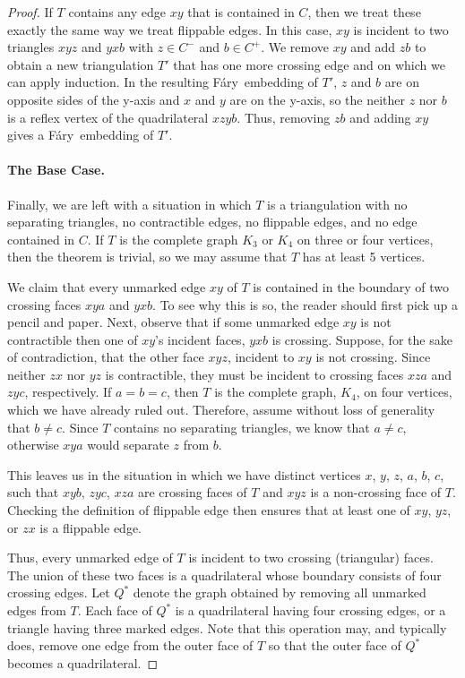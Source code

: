 \documentclass{patmorin}
\newcommand{\Fary}{Fáry}
\begin{document}
\begin{proof}
   If $T$ contains any edge $xy$ that is contained in $C$, then we
   treat these exactly the same way we treat flippable edges.  In this
   case, $xy$ is incident to two triangles $xyz$ and $yxb$ with $z\in
   C^-$ and $b\in C^+$. We remove $xy$ and add $zb$ to obtain a new
   triangulation $T'$ that has one more crossing edge and on which
   we can apply induction.  In the resulting \Fary\ embedding of $T'$,
   $z$ and $b$ are on opposite sides of the y-axis and $x$ and $y$
   are on the y-axis, so the neither $z$ nor $b$ is a reflex vertex of
   the quadrilateral $xzyb$.  Thus, removing $zb$ and adding $xy$ gives
   a \Fary\ embedding of $T'$.

   \paragraph{The Base Case.}

   Finally, we are left with a situation in which $T$ is a triangulation
   with no separating triangles, no contractible edges, no flippable
   edges, and no edge contained in $C$.  If $T$ is the complete graph
   $K_3$ or $K_4$ on three or four vertices, then the theorem is trivial,
   so we may assume that $T$ has at least 5 vertices.

   We claim that every unmarked edge $xy$ of $T$ is contained in the
   boundary of two crossing faces $xya$ and $yxb$.  To see why this
   is so, the reader should first pick up a pencil and paper. Next,
   observe that if some unmarked edge $xy$ is not contractible then
   one of $xy$'s incident faces, $yxb$ is crossing.  Suppose, for the
   sake of contradiction, that the other face $xyz$, incident to $xy$
   is not crossing.  Since neither $zx$ nor $yz$ is contractible, they
   must be incident to crossing faces $xza$ and $zyc$, respectively.
   If $a=b=c$, then $T$ is the complete graph, $K_4$, on four vertices,
   which we have already ruled out.  Therefore, assume without loss of
   generality that $b\neq c$.  Since $T$ contains no separating triangles,
   we know that $a\neq c$, otherwise $xya$ would separate $z$ from $b$.

   This leaves us in the situation in which we have distinct vertices $x$,
   $y$, $z$, $a$, $b$, $c$, such that $xyb$, $zyc$, $xza$ are crossing
   faces of $T$ and $xyz$ is a non-crossing face of $T$.  Checking the
   definition of flippable edge then ensures that at least one of $xy$,
   $yz$, or $zx$ is a flippable edge.

   Thus, every unmarked edge of $T$ is incident to two crossing
   (triangular) faces.  The union of these two faces is a quadrilateral
   whose boundary consists of four crossing edges.  Let $Q^*$ denote
   the graph obtained by removing all unmarked edges from $T$.
   Each face of $Q^*$ is a quadrilateral having four crossing edges,
   or a triangle having three marked edges.  Note that this operation
   may, and typically does, remove one edge from the outer face of $T$
   so that the outer face of $Q^*$ becomes a quadrilateral.


\end{proof}
\end{document}
